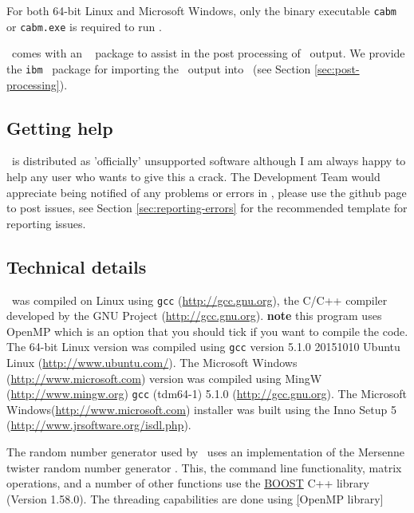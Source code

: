 For both 64-bit Linux and Microsoft Windows, only the binary executable \texttt{cabm} or \texttt{cabm.exe} is required to run \IBM .


\IBM\ comes with an \href{http://www.r-project.org}{\R}\ \citep{R} package to assist in the post processing of \IBM\ output. We provide the \texttt{ibm} \R\ package for importing the \IBM\ output into \R\ (see Section \ref{sec:post-processing}).

\subsection{Getting help}

\IBM\ is distributed as 'officially' unsupported software although I am always happy to help any user who wants to give this a crack. The Development Team would appreciate being notified of any problems or errors in \IBM , please use the github page to post issues, see Section \ref{sec:reporting-errors} for the recommended template for reporting issues.

\subsection{Technical details}\label{sec:tech}

\IBM\ was compiled on Linux using \texttt{gcc} (\url{http://gcc.gnu.org}), the C/C++ compiler developed by the GNU Project (\url{http://gcc.gnu.org}). \textbf{note} this program uses OpenMP which is an option that you should tick if you want to compile the code. The 64-bit Linux  version was compiled using \texttt{gcc} version 5.1.0 20151010 Ubuntu Linux (\url{http://www.ubuntu.com/}). The Microsoft Windows (\url{http://www.microsoft.com}) version was compiled using MingW (\url{http://www.mingw.org}) \texttt{gcc} (tdm64-1) 5.1.0 (\url{http://gcc.gnu.org}). The Microsoft Windows(\url{http://www.microsoft.com}) installer was built using the Inno Setup 5 (\url{http://www.jrsoftware.org/isdl.php}).

The random number generator used by \IBM\ uses an implementation of the Mersenne twister random number generator \citep{796}. This, the command line functionality, matrix operations, and a number of other functions use the \href{http://www.boost.org/}{BOOST} C++ library (Version 1.58.0). The threading capabilities are done using \href{https://www.openmp.org/}[OpenMP library]


